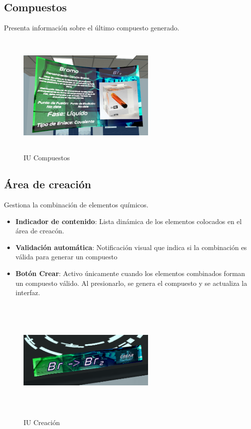 \subsection{Compuestos}
Presenta información sobre el último compuesto generado.
\begin{figure}[thbp]
    \centering
    \includegraphics[width=0.6\textwidth, height = 6cm]{img/chapter04/UI_Compuestos.png}
    \caption{IU Compuestos}
    \label{fig:Compuestos_IU}
\end{figure}

\subsection{Área de creación}
Gestiona la combinación de elementos químicos.
\begin{itemize}
    \item \textbf{Indicador de contenido}: Lista dinámica de los elementos colocados en el área de creacón.
    \item \textbf{Validación automática}: Notificación visual que indica si la combinación es válida para generar un compuesto
    \item \textbf{Botón Crear}: Activo únicamente cuando los elementos combinados forman un compuesto válido. Al presionarlo, se genera el compuesto y se actualiza la interfaz.
\end{itemize}
\begin{figure}[thbp]
    \centering
    \includegraphics[width=0.6\textwidth, height = 6cm]{img/chapter04/UI_Creacion.png}
    \caption{IU Creación}
    \label{fig:Creación_IU}
\end{figure}
\newpage
